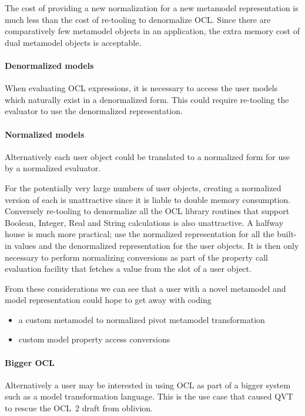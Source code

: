 \documentclass{jot}
\begin{document}
The cost of providing a new normalization for a new metamodel representation is much less than the cost of re-tooling to denormalize OCL. Since there are comparatively few metamodel objects in an application, the extra memory cost of dual metamodel objects is acceptable.

\paragraph{Denormalized models} When evaluating OCL expressions, it is necessary to access the user models which naturally exist in a denormalized form. This could require re-tooling the evaluator to use the denormalized representation. 

\paragraph{Normalized models} Alternatively each user object could be translated to a normalized form for use by a normalized evaluator.

For the potentially very large numbers of user objects, creating a normalized version of each is unattractive since it is liable to double memory consumption. Conversely re-tooling to denormalize all the OCL library routines that support Boolean, Integer, Real and String calculations is also unattractive. A halfway house is much more practical; use the normalized representation for all the built-in values and the denormalized representation for the user objects. It is then only necessary to perform normalizing conversions as part of the property call evaluation facility that fetches a value from the slot of a user object.

From these considerations we can see that a user with a novel metamodel and model representation could hope to get away with coding
\begin{itemize}
	\item a custom metamodel to normalized pivot metamodel transformation
	\item custom model property access conversions
\end{itemize}

\paragraph{Bigger OCL}

Alternatively a user may be interested in using OCL as part of a bigger system such as a model transformation language. This is the use case that caused QVT to rescue the OCL~2 draft from oblivion.
\end{document}
